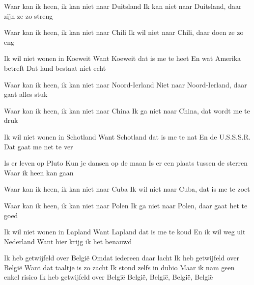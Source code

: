 \begin{verse*}
Waar kan ik heen,
ik kan niet naar Duitsland
Ik kan niet naar Duitsland, daar zijn ze zo streng
\end{verse*}

\begin{verse*}
Waar kan ik heen,
ik kan niet naar Chili
Ik wil niet naar Chili, daar doen ze zo eng
\end{verse*}

\begin{verse*}
Ik wil niet wonen in Koeweit
Want Koeweit dat is me te heet
En wat Amerika betreft
Dat land bestaat niet echt
\end{verse*}

\begin{verse*}
Waar kan ik heen,
ik kan niet naar Noord-Ierland
Niet naar Noord-Ierland, daar gaat alles stuk
\end{verse*}

\begin{verse*}
Waar kan ik heen,
ik kan niet naar China
Ik ga niet naar China, dat wordt me te druk
\end{verse*}

\begin{verse*}
Ik wil niet wonen in Schotland
Want Schotland dat is me te nat
En de U.S.S.S.R.
Dat gaat me net te ver
\end{verse*}

\begin{chorus}
Is er leven op Pluto
Kun je dansen op de maan
Is er een plaats tussen de sterren
Waar ik heen kan gaan
\end{chorus}

\begin{verse*}
Waar kan ik heen,
ik kan niet naar Cuba
Ik wil niet naar Cuba, dat is me te zoet
\end{verse*}

\begin{verse*}
Waar kan ik heen,
ik kan niet naar Polen
Ik ga niet naar Polen, daar gaat het te goed
\end{verse*}

\begin{verse*}
Ik wil niet wonen in Lapland
Want Lapland dat is me te koud
En ik wil weg uit Nederland
Want hier krijg ik het benauwd
\end{verse*}

\begin{verse*}
Ik heb getwijfeld over België
Omdat iedereen daar lacht
Ik heb getwijfeld over België
Want dat taaltje is zo zacht
Ik stond zelfs in dubio
Maar ik nam geen enkel risico
Ik heb getwijfeld over België
België, België, België, België
\end{verse*}
